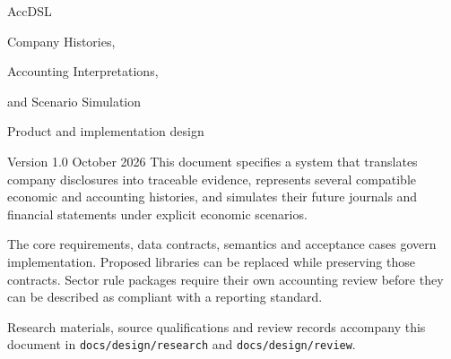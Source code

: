 \documentclass[11pt,a4paper]{report}
\newcommand{\code}[1]{\texttt{#1}}
\begin{document}
\begin{titlepage}
\vspace*{20mm}
{\sffamily\color{ink}\Huge AccDSL\par}
\vspace{7mm}
{\LARGE Company Histories,\par Accounting Interpretations,\par and Scenario Simulation\par}
\vspace{12mm}
{\Large Product and implementation design\par}
\vspace{5mm}
Version 1.0  October 2026
\vfill
This document specifies a system that translates company disclosures into
traceable evidence, represents several compatible economic and accounting
histories, and simulates their future journals and financial statements under
explicit economic scenarios.

The core requirements, data contracts, semantics and acceptance cases govern
implementation. Proposed libraries can be replaced while preserving those
contracts. Sector rule packages require their own accounting review before
they can be described as compliant with a reporting standard.

\vspace{8mm}
Research materials, source qualifications and review records accompany this
document in \code{docs/design/research} and \code{docs/design/review}.
\end{titlepage}
\tableofcontents
\clearpage{}










\appendix




\end{document}
